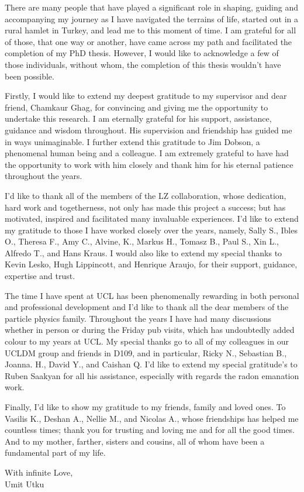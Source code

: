\begin{acknowledgements}

There are many people that have played a significant role in shaping, guiding and accompanying my journey as I have navigated the terrains of life, started out in a rural hamlet in Turkey, and lead me to this moment of time. I am grateful for all of those, that one way or another, have came across my path and facilitated the completion of my PhD thesis. However, I would like to acknowledge a few of those individuals, without whom, the completion of this thesis wouldn't have been possible.

Firstly, I would like to extend my deepest gratitude to my supervisor and dear friend, Chamkaur Ghag, for convincing and giving me the opportunity to undertake this research. I am eternally grateful for his support, assistance, guidance and wisdom throughout. His supervision and friendship has guided me in ways unimaginable. I further extend this gratitude to Jim Dobson, a phenomenal human being and a colleague. I am extremely grateful to have had the opportunity to work with him closely and thank him for his eternal patience throughout the years.

I'd like to thank all of the members of the LZ collaboration, whose dedication, hard work and togetherness, not only has made this project a success; but has motivated, inspired and facilitated many invaluable experiences. I'd like to extend my gratitude to those I have worked closely over the years, namely, Sally S., Ibles O., Theresa F., Amy C., Alvine, K., Markus H., Tomasz B., Paul S., Xin L., Alfredo T., and Hans Kraus. I would also like to extend my special thanks to Kevin Lesko, Hugh Lippincott, and Henrique Araujo, for their support, guidance, expertise and trust.

The time I have spent at UCL has been phenomenally rewarding in both personal and professional development and I'd like to thank all the dear members of the particle physics family. Throughout the years I have had many discussions whether in person or during the Friday pub visits, which has undoubtedly added colour to my years at UCL. My special thanks go to all of my colleagues in our UCLDM group and friends in D109, and in particular, Ricky N., Sebastian B., Joanna. H., David Y., and Caishan Q. I'd like to extend my special gratitude's to Ruben Saakyan for all his assistance, especially with regards the radon emanation work.

Finally, I'd like to show my gratitude to my friends, family and loved ones. To Vasilis K., Deshan A., Nellie M., and Nicolas A., whose friendships has helped me countless times; thank you for trusting and loving me and for all the good times. And to my mother, farther,  sisters and cousins, all of whom have been a fundamental part of my life.

\vspace*{1cm}
\begin{flushright}
    With infinite Love, \\
    Umit Utku
\end{flushright}

\end{acknowledgements}


